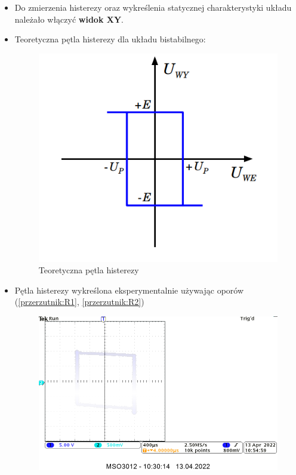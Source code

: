 \begin{itemize}
    \item Do zmierzenia histerezy oraz wykreślenia statycznej charakterystyki układu należało włączyć \textbf{widok XY}.
    \item Teoretyczna pętla histerezy dla układu bistabilnego:
        \begin{figure}[H]
            \centering
            \includegraphics[scale=0.6]{img/theoretical/przerzutnik_histereza.png}
            \caption{Teoretyczna pętla histerezy}
            \label{fig:teoretyczna_histereza}
        \end{figure}
    \item Pętla histerezy wykreślona eksperymentalnie używając oporów (\ref{przerzutnik:R1}, \ref{przerzutnik:R2})
        \begin{figure}[H]
            \centering
            \includegraphics[scale=0.45]{img/osciloscope/1_4_histereza_XY_sin_cropped.png}

\end{figure}
\end{itemize}

